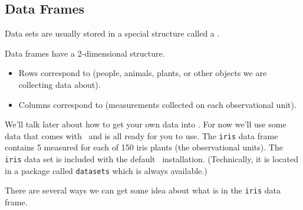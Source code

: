 \begin{knitrout}
\end{knitrout}


\subsection{Data Frames}

Data sets are usually stored in a special structure called a .

\begin{boxedText}
Data frames have a 2-dimensional structure.  
\medskip
\begin{itemize}
\item 
Rows correspond to 
 (people, animals, plants, or other objects we
are collecting data about).
\item
Columns correspond to  (measurements collected on each 
observational unit).
\end{itemize}
\end{boxedText}

We'll talk later about how to get your own data into \R.  For now we'll use 
some data that comes with \R\ and is all ready for you to use.
The \verb!iris! data frame contains 5  measured for each
of 150 iris plants (the observational units).  
The \verb!iris! data set is included with the default \R\ installation.  
(Technically, it is located in a package called \verb!datasets!  which is always available.)

There are several ways we can get some idea about what is in the \verb!iris! data frame.

\begin{knitrout}
\end{knitrout}


